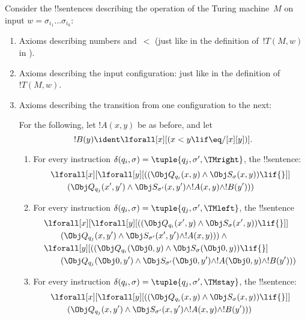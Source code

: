 \documentclass[../../../include/open-logic-section]{subfiles}
\begin{document}
Consider the !!{sentence}s describing the operation of the Turing
machine~$M$ on input $w = \sigma_{i_1}\dots\sigma_{i_k}$:
\begin{enumerate}
\item Axioms describing numbers and~$<$ (just like in the definition
of~$!T(M,w)$ in ).
\item Axioms describing the input configuration: just like in the definition
of~$!T(M,w)$.
\item Axioms describing the transition from one configuration to
  the next:

For the following, let $!A(x, y)$ be as before, and let
\[
  !B(y) \ident \lforall[x][(x < y \lif \eq/[x][y])].
\]
\begin{enumerate}
\item {} For every instruction $\delta(q_i, \sigma) =
  \tuple{q_j, \sigma', \TMright}$, the !!{sentence}:
\begin{align*}
& \lforall[x][\lforall[y][(
   (\Obj Q_{q_i}(x, y) \land \Obj S_{\sigma}(x, y)) \lif {}]] \\
&\qquad   (\Obj Q_{q_j}(x', y') \land \Obj S_{\sigma'}(x, y') \land
!A(x, y) \land !B(y')))
\end{align*}
\item {} For every instruction $\delta(q_i, \sigma) =
  \tuple{q_j, \sigma', \TMleft}$, the !!{sentence}
\begin{align*}
& \lforall[x][\lforall[y][
    ((\Obj Q_{q_i}(x', y) \land \Obj S_{\sigma}(x', y)) \lif {}]]\\
& \qquad   (\Obj Q_{q_j}(x, y') \land \Obj S_{\sigma'}(x', y') \land
!A(x, y))) \land {}\\
& \lforall[y][((\Obj Q_{q_i}(\Obj 0, y) \land \Obj S_{\sigma}(\Obj 0,
    y)) \lif {}]\\
& \qquad (\Obj Q_{q_j}(\Obj 0, y') \land \Obj S_{\sigma'}(\Obj 0,
  y') \land !A(\Obj 0, y) \land !B(y')))
\end{align*}
\item {} For every instruction $\delta(q_i, \sigma) =
  \tuple{q_j, \sigma', \TMstay}$, the !!{sentence}:
\begin{align*}
& \lforall[x][\lforall[y][(
   (\Obj Q_{q_i}(x, y) \land \Obj S_{\sigma}(x, y)) \lif {}]] \\
&\qquad (\Obj Q_{q_j}(x, y') \land \Obj S_{\sigma'}(x, y') \land
!A(x, y) \land !B(y')))
\end{align*}
\end{enumerate}

\end{enumerate}
\end{document}
